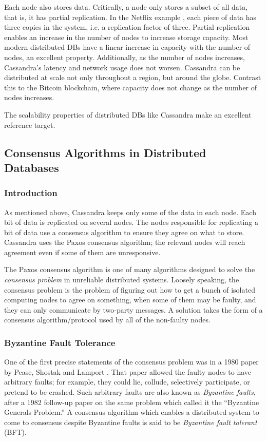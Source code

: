 Each node also stores data.
Critically, a node only stores a subset of all data, that is, it has partial replication.
In the Netflix example \cite{kalantzis_netflix}, each piece of data has three copies in the system, i.e. a replication factor of three.
Partial replication enables an increase in the number of nodes to increase storage capacity.
Most modern distributed DBs have a linear increase in capacity with the number of nodes, an excellent property.
Additionally, as the number of nodes increases, Cassandra’s latency and network usage does not worsen.
Cassandra can be distributed at scale not only throughout a region, but around the globe.
Contrast this to the Bitcoin blockchain, where capacity does not change as the number of nodes increases.

The scalability properties of distributed DBs like Cassandra make an excellent reference target.

\subsection{Consensus Algorithms in Distributed Databases}\label{subsec:consensus}
\subsubsection{Introduction}
As mentioned above, Cassandra keeps only some of the data in each node. Each bit of data is replicated on several nodes. The nodes responsible for replicating a bit of data use a consensus algorithm to ensure they agree on what to store. Cassandra uses the Paxos consensus algorithm; the relevant nodes will reach agreement even if some of them are unresponsive.

The Paxos consensus algorithm is one of many algorithms designed to solve the \emph{consensus problem} in unreliable distributed systems. Loosely speaking, the consensus problem is the problem of figuring out how to get a bunch of isolated computing nodes to agree on something, when some of them may be faulty, and they can only communicate by two-party messages. A solution takes the form of a consensus algorithm/protocol used by all of the non-faulty nodes.

\subsubsection{Byzantine Fault Tolerance}
One of the first precise statements of the consensus problem was in a 1980 paper by Pease, Shostak and Lamport \cite{pease1980reaching,lamport_writings}. That paper allowed the faulty nodes to have arbitrary faults; for example, they could lie, collude, selectively participate, or pretend to be crashed. Such arbitrary faults are also known as \emph{Byzantine faults}, after a 1982 follow-up paper on the same problem \cite{lamport1982byzantine} which called it the ``Byzantine Generals Problem.'' A consensus algorithm which enables a distributed system to come to consensus despite Byzantine faults is said to be \emph{Byzantine fault tolerant} (BFT).

